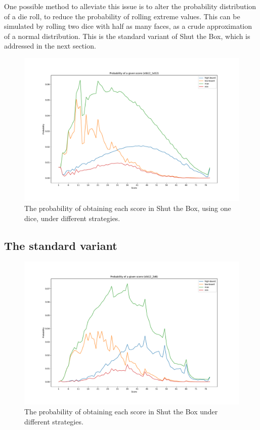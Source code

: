 One possible method to alleviate this issue is to alter the probability distribution of a die roll, to reduce the probability of rolling extreme values. This can be simulated by rolling two dice with half as many faces, as a crude approximation of a normal distribution. This is the standard variant of Shut the Box, which is addressed in the next section.

\begin{figure}
    \centering
    \includegraphics[width=\textwidth]{images/ShutTheBox/stb12_1d12_prob_score.pdf}
    \caption{The probability of obtaining each score in Shut the Box, using one dice, under different strategies.}
\label{cs1:stb12_1d12_prob_score}
\end{figure}

\subsection{The standard variant}
\label{cs1:stb_standard}

\begin{figure}
    \centering
    \includegraphics[width=\textwidth]{images/ShutTheBox/stb12_2d6_prob_score.pdf}
    \caption{The probability of obtaining each score in Shut the Box under different strategies.}
\label{cs1:stb12_2d6_prob_score}
\end{figure}

